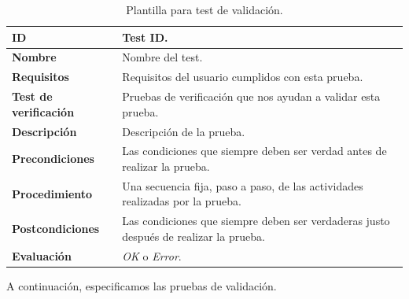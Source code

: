 \begin{center}
\begin{table}[htbp]
\centering
\caption{Plantilla para test de validación.}
\begin{tabular}{@{}p{2.5cm} p{9cm}@{}} 
\toprule
\textbf{ID} 					& Test ID. \\
\midrule
\textbf{Nombre} 				& Nombre del test. \\
\midrule
\textbf{Requisitos} 		& Requisitos del usuario cumplidos con esta prueba. \\
\midrule
\textbf{Test de verificación} 	& Pruebas de verificación que nos ayudan a validar esta prueba. \\
\midrule
\textbf{Descripción} 		& Descripción de la prueba. \\
\midrule
\textbf{Precondiciones}		& Las condiciones que siempre deben ser verdad antes de realizar la prueba. \\
\midrule
\textbf{Procedimiento}			& Una secuencia fija, paso a paso, de las actividades realizadas por la prueba. \\
\midrule
\textbf{Postcondiciones} 		& Las condiciones que siempre deben ser verdaderas justo después de realizar la prueba. \\
\midrule
\textbf{Evaluación} 			& \textit{OK} o \textit{Error}. \\
\bottomrule
\end{tabular}
\label{tab:validation_tests}
\end{table}
\end{center}

\clearpage


A continuación, especificamos las pruebas de validación.

